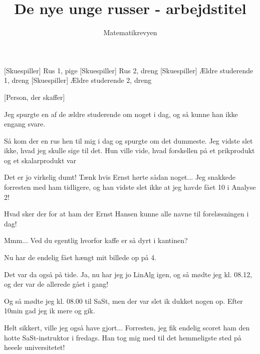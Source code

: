 \documentclass[a4paper,11pt]{article}
\title{De nye unge russer - arbejdstitel}
\author{Matematikrevyen}
\begin{document}
\maketitle

\begin{roles}
[Skuespiller] Rus 1, pige
[Skuespiller] Rus 2, dreng
[Skuespiller] Ældre studerende 1, dreng
[Skuespiller] Ældre studerende 2, dreng
\end{roles}

\begin{props}
[Person, der skaffer]
\end{props}

\begin{sketch}

 Jeg spurgte en af de ældre studerende om noget i dag, og så kunne han ikke engang svare.

 Så kom der en rus hen til mig i dag og spurgte om det dummeste. Jeg vidste slet ikke, hvad jeg skulle sige til det. Hun ville vide, hvad forskellen på et prikprodukt og et skalarprodukt var 

 Det er jo virkelig dumt! Tænk hvis Ernst hørte sådan noget... Jeg snakkede forresten med ham tidligere, og han vidste slet ikke at jeg havde fået 10 i Analyse 2!

 Hvad sker der for at ham der Ernst Hansen kunne alle navne til forelæsningen i dag!

 Mmm...  Ved du egentlig hvorfor kaffe er så dyrt i kantinen?

 Nu har de endelig fået hængt mit billede op på 4.

 Det var da også på tide. Ja, nu har jeg jo LinAlg igen, og så mødte jeg kl. 08.12, og der var de allerede gået i gang!

 Og så mødte jeg kl. 08.00 til SaSt, men der var slet ik dukket nogen op. Efter 10min gad jeg ik mere og gik.

 Helt sikkert, ville jeg også have gjort... Forresten, jeg fik endelig scoret ham den hotte SaSt-instruktor i fredags. Han tog mig med til det hemmeligste  sted på heeele universitetet!


\end{sketch}
\end{document}
